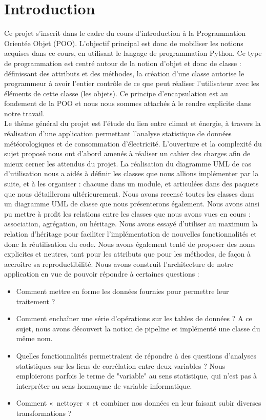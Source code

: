 \documentclass[11pt]{article}
\begin{document}
\section*{Introduction}

Ce projet s'inscrit dans le cadre du cours d'introduction à la Programmation Orientée Objet (POO). L'objectif principal est donc de mobiliser les notions acquises dans ce cours, en utilisant le langage de programmation Python. Ce type de programmation est centré autour de la notion d'objet et donc de classe : définissant des attributs et des méthodes, la création d'une classe autorise le programmeur à avoir l'entier contrôle de ce que peut réaliser l'utilisateur avec les éléments de cette classe (les objets). Ce principe d'encapsulation est au fondement de la POO et nous nous sommes attachés à le rendre explicite dans notre travail. \\

Le thème général du projet est l'étude du lien entre climat et énergie, à travers la réalisation d'une application permettant l'analyse statistique de données météorologiques et de consommation d'électricité. L'ouverture et la complexité du sujet proposé nous ont d'abord amenés à réaliser un cahier des charges afin de mieux cerner les attendus du projet. La réalisation du diagramme UML de cas d'utilisation nous a aidés à définir les classes que nous allions implémenter par la suite, et à les organiser : chacune dans un module, et articulées dans des paquets que nous détaillerons ultérieurement. Nous avons recensé toutes les classes dans un diagramme UML de classe que nous présenterons également. Nous avons ainsi pu mettre à profit les relations entre les classes que nous avons vues en cours : association, agrégation, ou héritage. Nous avons essayé d'utiliser au maximum la relation d'héritage pour faciliter l'implémentation de nouvelles fonctionnalités et donc la réutilisation du code. Nous avons également tenté de proposer des noms explicites et neutres, tant pour les attributs que pour les méthodes, de façon à accroître sa reproductibilité.
Nous avons construit l'architecture de notre application en vue de pouvoir répondre à certaines questions : 
\begin{itemize}
    \item Comment mettre en forme les données fournies pour permettre leur traitement ?
    \item  Comment enchaîner une série d'opérations sur les tables de données ? A ce sujet, nous avons découvert la notion de pipeline et implémenté une classe du même nom. 
    \item Quelles fonctionnalités permettraient de répondre à des questions d'analyses statistiques sur les liens de corrélation entre deux variables ? Nous emploierons parfois le terme de "variable" au sens statistique, qui n'est pas à interpréter au sens homonyme de variable informatique. 
    \item Comment «~nettoyer~» et combiner nos données en leur faisant subir diverses transformations ?\\
\end{itemize}
\end{document}
